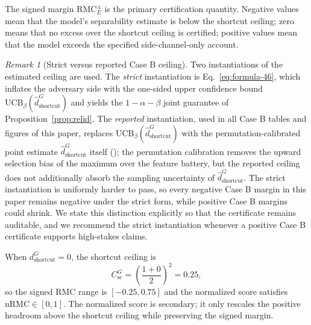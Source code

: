\documentclass[conference]{IEEEtran}
\theoremstyle{remark}
\newtheorem{remark}{Remark}
\newcommand{\LCB}{\mathrm{LCB}}
\newcommand{\UCB}{\mathrm{UCB}}
\newcommand{\RMC}{\mathrm{RMC}}
\newcommand{\shat}{\hat{s}_G}
\newcommand{\shortcutDisc}{d_{\mathrm{shortcut}}^{G}}
\newcommand{\hatshortcutDisc}{\hat d_{\mathrm{shortcut}}^{G}}
\newcommand{\shortcutCeiling}{C_{\mathrm{sc}}^{G}}
\begin{document}
The signed margin $\RMC_E^{\pm}$ is the primary certification quantity.
Negative values mean that the model's separability estimate is below the
shortcut ceiling; zero means that no excess over the shortcut ceiling is
certified; positive values mean that the model exceeds the specified
side-channel-only account.

\begin{remark}[Strict versus reported Case B ceiling]\label{rem:caseb-variants}
Two instantiations of the estimated ceiling are used.  The \emph{strict}
instantiation is Eq.~\eqref{eq:formula-46}, which inflates the adversary side
with the one-sided upper confidence bound $\UCB_{\beta}(\hatshortcutDisc)$ and
yields the $1-\alpha-\beta$ joint guarantee of Proposition~\ref{prop:relid}.
The \emph{reported} instantiation, used in all Case B tables and figures of
this paper, replaces $\UCB_{\beta}(\hatshortcutDisc)$ with the
permutation-calibrated point estimate $\hatshortcutDisc$ itself
(); the permutation calibration removes the upward
selection bias of the maximum over the feature battery, but the reported
ceiling does not additionally absorb the sampling uncertainty of
$\hatshortcutDisc$.  The strict instantiation is uniformly harder to pass, so
every negative Case B margin in this paper remains negative under the strict
form, while positive Case B margins could shrink.  We state this distinction
explicitly so that the certificate remains auditable, and we recommend the
strict instantiation whenever a positive Case B certificate supports
high-stakes claims.
\end{remark}


When $\shortcutDisc=0$, the shortcut ceiling is
\begin{equation}\label{eq:formula-52}
\shortcutCeiling=\left(\frac{1+0}{2}\right)^2=0.25,
\end{equation}
so the signed RMC range is $[-0.25,0.75]$ and the normalized score satisfies
$\mathrm{nRMC}\in[0,1]$.
The normalized score is secondary; it only rescales the positive headroom above
the shortcut ceiling while preserving the signed margin.
\end{document}
